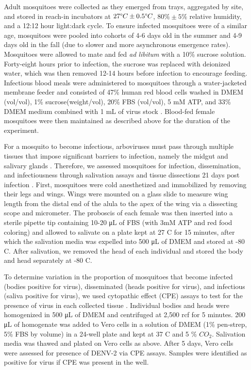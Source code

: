 \documentclass[doublespacing, linenumbers]{bmcart}
\begin{document}
Adult mosquitoes were collected as they emerged from trays, aggregated by site, and stored in reach-in incubators at $27 \degree C \pm 0.5 \degree C$, $80\% \pm 5\%$ relative humidity, and a 12:12 hour light:dark cycle.
To ensure infected mosquitoes were of a similar age, mosquitoes were pooled into cohorts of 4-6 days old in the summer and 4-9 days old in the fall (due to slower and more asynchronous emergence rates).
Mosquitoes were allowed to mate and fed \textit{ad libitum} with a 10\% sucrose solution.
Forty-eight hours prior to infection, the sucrose was replaced with deionized water, which was then removed 12-14 hours before infection to encourage feeding.
Infectious blood meals were administered to mosquitoes through a water-jacketed membrane feeder and consisted of 47\% human red blood cells washed in DMEM (vol/vol), 1\% sucrose(weight/vol), 20\% FBS (vol/vol), 5 mM ATP, and 33\% DMEM medium combined with 1 mL of virus stock \cite{shan2016}.
Blood-fed female mosquitoes were then maintained as described above for the duration of the experiment.

For a mosquito to become infectious, arboviruses must pass through multiple tissues that impose significant barriers to infection, namely the midgut and salivary glands \cite{cheng2016}.
Therefore, we assessed mosquitoes for infection, dissemination, and infectiousness through salivation assays and tissue dissections 21 days post infection \cite{anderson2010}.
First, mosquitoes were cold anesthetized and immobilized by removing their legs and wings.
Wings were mounted on a glass slide to measure wing length from the distal end of the alula to the apex of the wing via a dissecting scope and micrometer.
The proboscis of each female was then inserted into a sterile pipette tip containing 10-20 \si{\micro\liter} of FBS (with 3mM ATP and red food coloring) and allowed to salivate  on a plate kept at 27 \degree C for 15 minutes, after which the salivation media was expelled into 500 \si{\micro\liter} of DMEM and stored at -80 \degree C.
After salivation, we removed the head of each individual and stored the body and head separately at -80 \degree C.

To determine variation in the proportion of mosquitoes that become infected (bodies positive for virus), disseminated (heads positive for virus), and infectious (saliva positive for virus), we used cytopathic effect (CPE) assays to test for the presence of virus in each collected tissue \cite{willard2017}.
Individual bodies and heads were homogenized in 500 \si{\micro\liter} of DMEM and centrifuged at 2,500 rcf for 5 minutes. 200 \si{\micro\liter} of homogenate was added to Vero cells in a solution of DMEM (1\% pen-strep, 5\% FBS by volume) in a 24-well plate and kept at 37 \degree C and 5 \% ${CO_2}$.
Salivation media was thawed and plated on Vero cells as above.
After 5 days, Vero cells were assessed for presence of DENV-2 via CPE assays.
Samples were identified as positive for virus if CPE was present in the well.
\end{document}
